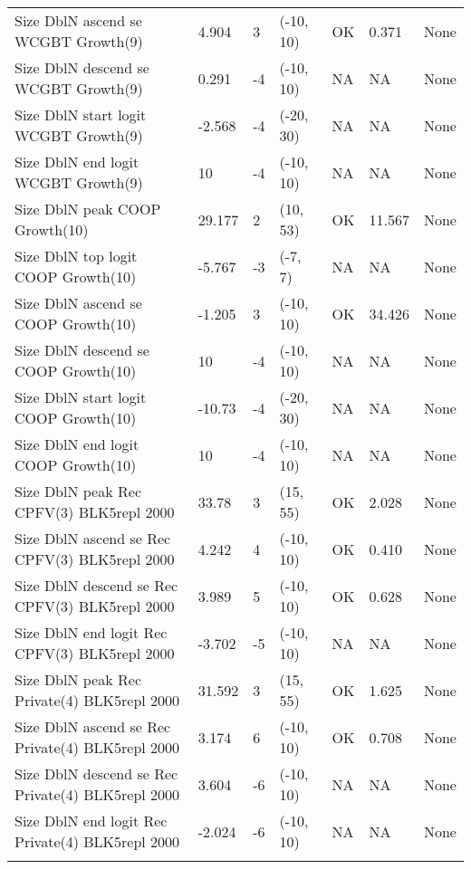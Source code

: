 \documentclass[11pt,
  english,
  letterpaper,
]{article}
\begin{document}
\begin{landscape}
\begin{longtable}[t]{>{\raggedright\arraybackslash}p{7.5cm}lllll>{\raggedright\arraybackslash}p{3.5cm}}
Size DblN ascend se WCGBT Growth(9) & 4.904 & 3 & (-10, 10) & OK & 0.371 & None\\
Size DblN descend se WCGBT Growth(9) & 0.291 & -4 & (-10, 10) & NA & NA & None\\
Size DblN start logit WCGBT Growth(9) & -2.568 & -4 & (-20, 30) & NA & NA & None\\
Size DblN end logit WCGBT Growth(9) & 10 & -4 & (-10, 10) & NA & NA & None\\
Size DblN peak COOP Growth(10) & 29.177 & 2 & (10, 53) & OK & 11.567 & None\\
Size DblN top logit COOP Growth(10) & -5.767 & -3 & (-7, 7) & NA & NA & None\\
Size DblN ascend se COOP Growth(10) & -1.205 & 3 & (-10, 10) & OK & 34.426 & None\\
Size DblN descend se COOP Growth(10) & 10 & -4 & (-10, 10) & NA & NA & None\\
Size DblN start logit COOP Growth(10) & -10.73 & -4 & (-20, 30) & NA & NA & None\\
Size DblN end logit COOP Growth(10) & 10 & -4 & (-10, 10) & NA & NA & None\\
Size DblN peak Rec CPFV(3) BLK5repl 2000 & 33.78 & 3 & (15, 55) & OK & 2.028 & None\\
Size DblN ascend se Rec CPFV(3) BLK5repl 2000 & 4.242 & 4 & (-10, 10) & OK & 0.410 & None\\
Size DblN descend se Rec CPFV(3) BLK5repl 2000 & 3.989 & 5 & (-10, 10) & OK & 0.628 & None\\
Size DblN end logit Rec CPFV(3) BLK5repl 2000 & -3.702 & -5 & (-10, 10) & NA & NA & None\\
Size DblN peak Rec Private(4) BLK5repl 2000 & 31.592 & 3 & (15, 55) & OK & 1.625 & None\\
Size DblN ascend se Rec Private(4) BLK5repl 2000 & 3.174 & 6 & (-10, 10) & OK & 0.708 & None\\
Size DblN descend se Rec Private(4) BLK5repl 2000 & 3.604 & -6 & (-10, 10) & NA & NA & None\\
Size DblN end logit Rec Private(4) BLK5repl 2000 & -2.024 & -6 & (-10, 10) & NA & NA & None\\*
\end{longtable}
\endgroup{}
\end{landscape}
\endgroup{}

\newpage



\newpage
\end{document}
